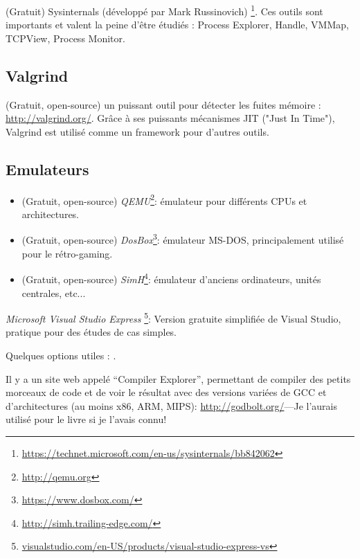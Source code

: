 (Gratuit) Sysinternals (développé par Mark Russinovich)
\footnote{\url{https://technet.microsoft.com/en-us/sysinternals/bb842062}}.
Ces outils sont importants et valent la peine d'être étudiés : Process Explorer, Handle, VMMap, TCPView, Process Monitor.

\subsection{Valgrind}

(Gratuit, open-source) un puissant outil pour détecter les fuites mémoire : \url{http://valgrind.org/}.
Grâce à ses puissants mécanismes \ac{JIT} ("Just In Time"), Valgrind est utilisé comme un framework pour d'autres outils.


\subsection{Emulateurs}

\begin{itemize}
\item (Gratuit, open-source) \emph{QEMU}\footnote{\url{http://qemu.org}}: émulateur pour différents CPUs et architectures.

\item (Gratuit, open-source) \emph{DosBox}\footnote{\url{https://www.dosbox.com/}}: émulateur MS-DOS, principalement utilisé pour le rétro-gaming.

\item (Gratuit, open-source) \emph{SimH}\footnote{\url{http://simh.trailing-edge.com/}}: émulateur d'anciens ordinateurs, unités centrales, etc...
\end{itemize}


\emph{Microsoft Visual Studio Express}
\footnote{\href{http://www.microsoft.com/express/Downloads/}{visualstudio.com/en-US/products/visual-studio-express-vs}}:
Version gratuite simplifiée de Visual Studio, pratique pour des études de cas simples.

Quelques options utiles : .

Il y a un site web appelé ``Compiler Explorer'', permettant de compiler des petits
morceaux de code et de voir le résultat avec des versions variées de GCC et d'architectures
(au moins x86, ARM, MIPS): \url{http://godbolt.org/}---Je l'aurais utilisé
pour le livre si je l'avais connu!

